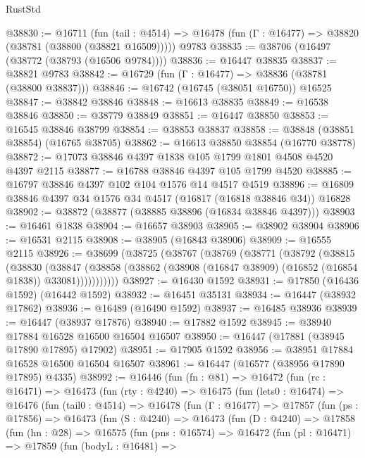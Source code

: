\begin{lexlean}{RustStd}
\begin{coremodule}
{\begin{coremodule}
{{{{{{{{{{{{{{{{{{{{{{{{{{{{{{{{{{{{{{{{{{{{{{{{{{{{{{{@38830 := @16711
    (fun (tail : @4514) => @16478 (fun (Γ : @16477) => @38820 (@38781 (@38800 (@38821 @16509)))))
    @9783
@38835 := @38706 (@16497 (@38772 (@38793 (@16506 @9784))))
@38836 := @16447 @38835
@38837 := @38821 @9783
@38842 := @16729 (fun (Γ : @16477) => @38836 (@38781 (@38800 @38837)))
@38846 := @16742 (@16745 (@38051 @16750)) @16525
@38847 := @38842 @38846
@38848 := @16613 @38835
@38849 := @16538 @38846
@38850 := @38779 @38849
@38851 := @16447 @38850
@38853 := @16545 @38846 @38799
@38854 := @38853 @38837
@38858 := @38848 (@38851 @38854) (@16765 @38705)
@38862 := @16613 @38850 @38854 (@16770 @38778)
@38872 := @17073 @38846 @4397 @1838 @105 @1799 @1801 @4508 @4520 @4397 @2115
@38877 := @16788 @38846 @4397 @105 @1799 @4520
@38885 := @16797 @38846 @4397 @102 @104 @1576 @14 @4517 @4519
@38896 := @16809 @38846 @4397 @34 @1576 @34 @4517 (@16817 (@16818 @38846 @34)) @16828
@38902 := @38872 (@38877 (@38885 @38896 (@16834 @38846 @4397)))
@38903 := @16461 @1838
@38904 := @16657 @38903
@38905 := @38902 @38904
@38906 := @16531 @2115
@38908 := @38905 (@16843 @38906)
@38909 := @16555 @2115
@38926 := @38699
    (@38725
      (@38767
        (@38769
          (@38771
            (@38792
              (@38815
                (@38830
                  (@38847
                    (@38858
                      (@38862 (@38908 (@16847 @38909) (@16852 (@16854 @1838)) @33081)))))))))))
@38927 := @16430 @1592
@38931 := @17850 (@16436 @1592) (@16442 @1592)
@38932 := @16451 @35131
@38934 := @16447 (@38932 @17862)
@38936 := @16489 (@16490 @1592)
@38937 := @16485 @38936
@38939 := @16447 (@38937 @17876)
@38940 := @17882 @1592
@38945 := @38940 @17884 @16528 @16500 @16504 @16507
@38950 := @16447 (@17881 (@38945 @17890 @17895) @17902)
@38951 := @17905 @1592
@38956 := @38951 @17884 @16528 @16500 @16504 @16507
@38961 := @16447 (@16577 (@38956 @17890 @17895) @4335)
@38992 := @16446
    (fun (fn : @81) =>
    @16472
      (fun (rc : @16471) =>
      @16473
        (fun (rty : @4240) =>
        @16475
          (fun (lets0 : @16474) =>
          @16476
            (fun (tail0 : @4514) =>
            @16478
              (fun (Γ : @16477) =>
              @17857
                (fun (ps : @17856) =>
                @16473
                  (fun (S : @4240) =>
                  @16473
                    (fun (D : @4240) =>
                    @17858
                      (fun (hn : @28) =>
                      @16575
                        (fun (pns : @16574) =>
                        @16472
                          (fun (pl : @16471) =>
                          @17859
                            (fun (bodyL : @16481) =>
}}}}}}}}}}}}}}}}}}}}}}}}}}}}}}}}}}}}}}}}}}}}}}}}}}}}}}}
\end{coremodule}}
\end{coremodule}
\end{lexlean}
